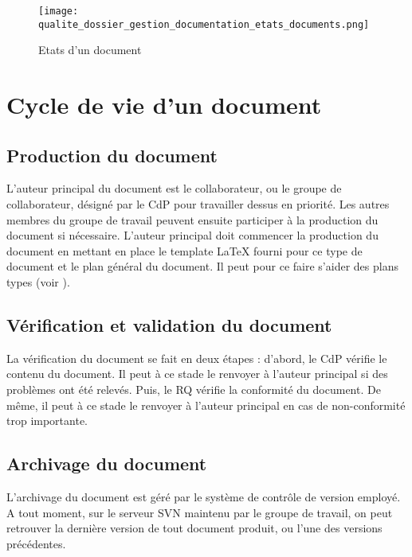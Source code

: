 \begin{figure}[!htp]
\begin{center}
\texttt{[image: qualite\_dossier\_gestion\_documentation\_etats\_documents.png]}
\caption{Etats d'un document}
\label{figure:dossier_gestion_documentation_etats_documents}
\end{center}
\end{figure}

\section{Cycle de vie d'un document}

\subsection{Production du document}

L'auteur principal du document est le collaborateur, ou le groupe de collaborateur, désigné par le CdP pour travailler dessus en priorité. Les autres membres du groupe de travail peuvent ensuite participer à la production du document si nécessaire. L'auteur principal doit commencer la production du document en mettant en place le template \LaTeX{} fourni pour ce type de document et le plan général du document. Il peut pour ce faire s'aider des plans types (voir ).

\subsection{Vérification et validation du document}

La vérification du document se fait en deux étapes : d'abord, le CdP vérifie le contenu du document. Il peut à ce stade le renvoyer à l'auteur principal si des problèmes ont été relevés. Puis, le RQ vérifie la conformité du document. De même, il peut à ce stade le renvoyer à l'auteur principal en cas de non-conformité trop importante.

\subsection{Archivage du document}

L'archivage du document est géré par le système de contrôle de version employé. A tout moment, sur le serveur SVN maintenu par le groupe de travail, on peut retrouver la dernière version de tout document produit, ou l'une des versions précédentes.

